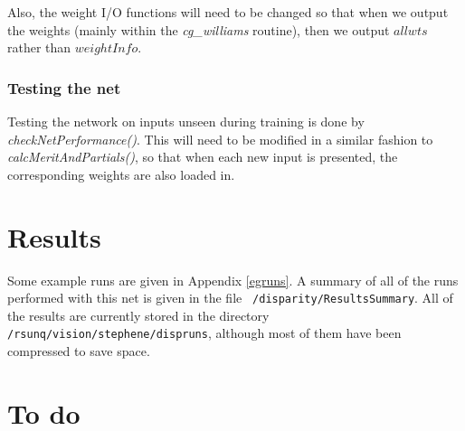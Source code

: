 \documentclass[a4paper]{article}
\begin{document}
Also, the weight I/O functions will need to be changed so that when we
output the weights (mainly within the \emph{cg\_williams} routine),
then we output $allwts$ rather than $weightInfo$.



\subsubsection{Testing the net}

Testing the network on inputs unseen during training is done by
\emph{checkNetPerformance()}.  This will need to be modified in a
similar fashion to \emph{calcMeritAndPartials()}, so that when each
new input is presented, the corresponding weights are also loaded in.


\section{Results}

Some example runs are given in Appendix \ref{egruns}.  A summary of
all of the runs performed with this net is given in the file
\texttt{~/disparity/ResultsSummary}.  All of the results are currently
stored in the directory \texttt{/rsunq/vision/stephene/dispruns},
although most of them have been compressed to save space.


\section{To do}
\end{document}
